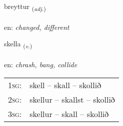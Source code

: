 \documentclass[frontgrid, backgrid]{flacards}\usepackage[]{graphicx}\usepackage[]{color}
\begin{document}
\renewcommand{\flhead}{\vskip5pt \fboxsep=0pt {\small\bfseries\footnotesize Lýsingarorð | Adjective}}
\renewcommand{\fcfoot}{\vskip5pt \fboxsep=0pt \hspace{2pt}{\small\bfseries\footnotesize 2K}}

\renewcommand{\blhead}{\vskip5pt {\small\bfseries\footnotesize Lýsingarorð | Adjective }}
\renewcommand{\bcfoot}{\vskip5pt \hspace{2pt}{\small\bfseries\footnotesize 2K}}


{breyttur \small{\textsubscript{(\textit{adj.})}} \\[1ex] %
\textphonetic{[preihtʏr]} \\
en: \emph{changed, different} \\  [2ex]
\renewcommand*{\arraystretch}{0.8}
}

\renewcommand{\flhead}{\vskip5pt \fboxsep=0pt {\small\bfseries\footnotesize Sagnorð | Verb}}
\renewcommand{\fcfoot}{\vskip5pt \fboxsep=0pt \hspace{2pt}{\small\bfseries\footnotesize 2K}}

\renewcommand{\blhead}{\vskip5pt {\small\bfseries\footnotesize Sagnorð | Verb }}
\renewcommand{\bcfoot}{\vskip5pt \hspace{2pt}{\small\bfseries\footnotesize 2K}}


{skella \small{\textsubscript{(\textit{v.})}} \\[1ex] %
\textphonetic{[scɛtla]} \\
en: \emph{chrash, bang, collide} \\  [2ex]
\renewcommand*{\arraystretch}{0.8}
\begin{tabular}{p{1cm}l}
\textsc{1sg}: & skell -- skall -- skollið \\ 
\textsc{2sg}: & skellur -- skallst -- skollið \\ 
\textsc{3sg}: & skellur -- skall -- skollið \\ 
\end{tabular}
}
\end{document}
